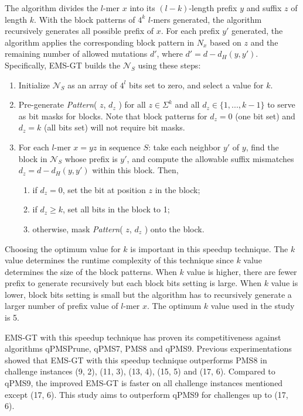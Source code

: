	

	The algorithm divides the $l$-mer $x$ into its $(l - k)$-length prefix $y$ and suffix $z$ of length $k$. With the block patterns of $4^k$ $l$-mers generated, the algorithm recursively generates all possible prefix of $x$. For each prefix $y'$ generated, the algorithm applies the corresponding block pattern in $N_x$ based on $z$ and the remaining number of allowed mutations $d'$, where $d' = d - d_H(y, y')$. Specifically, EMS-GT builds the $\mathcal{N}_S$ using these steps:

	\begin{enumerate}
		\item Initialize $\mathcal{N}_S$ as an array of $4^l$ bits set to zero, and select a value for $k$.

		\item Pre-generate {\em Pattern}( $z$, $d_z$ ) for all $z \in \Sigma^k$ and all $d_z \in \{1,...,k-1\}$ to serve as bit masks for blocks. Note that block patterns for $d_z=0$ (one bit set) and $d_z=k$ (all bits set) will not require bit masks.

		\item For each $l$-mer $x = yz$ in sequence $S$: take each neighbor $y'$ of $y$, find the block in $\mathcal{N}_S$ whose prefix is $y'$, and compute the allowable suffix mismatches $d_z = d - d_H(y,y')$ within this block. Then,

			\begin{enumerate}
				\item if $d_z = 0$, set the bit at position $z$ in the block;
				\item if $d_z \geq k$, set all bits in the block to 1;
				\item otherwise, mask {\em Pattern}( $z$, $d_z$ ) onto the block.
			\end{enumerate}
	\end{enumerate}

	Choosing the optimum value for $k$ is important in this speedup technique. The $k$ value determines the runtime complexity of this technique since $k$ value determines the size of the block patterns. When $k$ value is higher, there are fewer prefix to generate recursively but each block bits setting is large. When $k$ value is lower, block bits setting is small but the algorithm has to recursively generate a larger number of prefix value of $l$-mer $x$. The optimum $k$ value used in the study is 5.

	

	EMS-GT with this speedup technique has proven its competitiveness against algorithms qPMSPrune, qPMS7, PMS8 and qPMS9. Previous experimentations showed that EMS-GT with this speedup technique outperforms PMS8 in challenge instances (9, 2), (11, 3), (13, 4), (15, 5) and (17, 6). Compared to qPMS9, the improved EMS-GT is faster on all challenge instances mentioned except (17, 6). This study aims to outperform qPMS9 for challenges up to (17, 6).

	